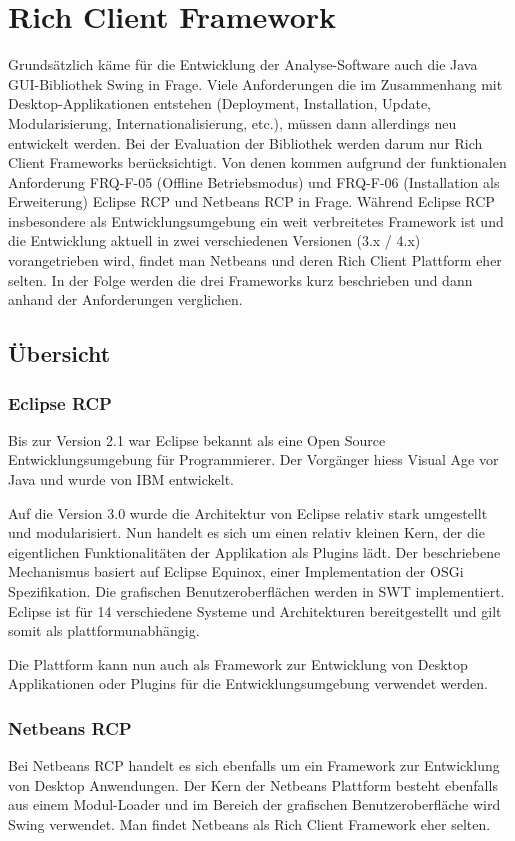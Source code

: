 \section{Rich Client Framework}
Grundsätzlich käme für die Entwicklung der Analyse-Software auch die Java GUI-Bibliothek Swing in Frage. Viele Anforderungen die im Zusammenhang mit Desktop-Applikationen entstehen (Deployment, Installation, Update, Modularisierung, Internationalisierung, etc.), müssen dann allerdings neu entwickelt werden. Bei der Evaluation der Bibliothek werden darum nur Rich Client Frameworks berücksichtigt. Von denen kommen aufgrund der funktionalen Anforderung FRQ-F-05 (Offline Betriebsmodus) und FRQ-F-06 (Installation als Erweiterung) Eclipse RCP und Netbeans RCP in Frage. Während Eclipse RCP insbesondere als Entwicklungsumgebung ein weit verbreitetes Framework ist und die Entwicklung aktuell in zwei verschiedenen Versionen (3.x / 4.x) vorangetrieben wird, findet man Netbeans und deren Rich Client Plattform eher selten. In der Folge werden die drei Frameworks kurz beschrieben und dann anhand der Anforderungen verglichen.


\subsection{Übersicht}
\subsubsection{Eclipse RCP}
Bis zur Version 2.1 war Eclipse bekannt als eine Open Source Entwicklungsumgebung für Programmierer. Der Vorgänger hiess Visual Age vor Java und wurde von IBM entwickelt. 

Auf die Version 3.0 wurde die Architektur von Eclipse relativ stark umgestellt und modularisiert. Nun handelt es sich um einen relativ kleinen Kern, der die eigentlichen Funktionalitäten der Applikation als Plugins lädt. Der beschriebene Mechanismus basiert auf Eclipse Equinox, einer Implementation der OSGi Spezifikation. Die grafischen Benutzeroberflächen werden in SWT implementiert. Eclipse ist für 14 verschiedene Systeme und Architekturen bereitgestellt und gilt somit als plattformunabhängig\cite{wiki:eclipse}. 

Die Plattform kann nun auch als Framework zur Entwicklung von Desktop Applikationen oder Plugins für die Entwicklungsumgebung  verwendet werden.


\subsubsection{Netbeans RCP}
Bei Netbeans RCP handelt es sich ebenfalls um ein Framework zur Entwicklung von Desktop Anwendungen. Der Kern der Netbeans Plattform besteht ebenfalls aus einem Modul-Loader und im Bereich der grafischen Benutzeroberfläche wird Swing verwendet. Man findet Netbeans als Rich Client Framework eher selten.

